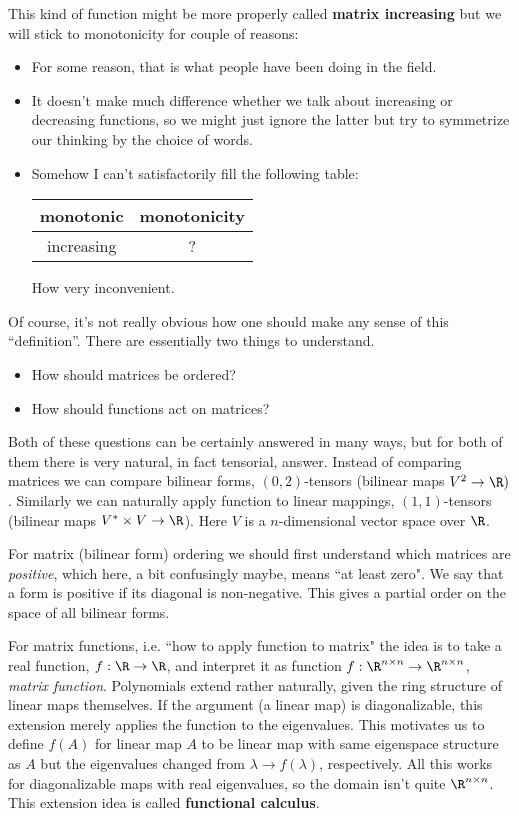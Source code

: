 This kind of function might be more properly called \textbf{matrix increasing} but we will stick to monotonicity for couple of reasons:
\begin{itemize}
	\item For some reason, that is what people have been doing in the field.
	\item It doesn't make much difference whether we talk about increasing or decreasing functions, so we might just ignore the latter but try to symmetrize our thinking by the choice of words.
	\item Somehow I can't satisfactorily fill the following table:
	\begin{center}
	\begin{tabular}{| c | c |}
		\hline
		monotonic & monotonicity \\
		\hline
		increasing & ? \\
		\hline
	\end{tabular}
	\end{center}
	How very inconvenient.
\end{itemize}

Of course, it's not really obvious how one should make any sense of this ``definition''. There are essentially two things to understand.
\begin{itemize}
	\item How should matrices be ordered?
	\item How should functions act on matrices?
\end{itemize}
Both of these questions can be certainly answered in many ways, but for both of them there is very natural, in fact tensorial, answer. Instead of comparing matrices we can compare bilinear forms, $(0, 2)$-tensors (bilinear maps $V^2 \to \R)$. Similarly we can naturally apply function to linear mappings, $(1, 1)$-tensors (bilinear maps $V^{*} \times V \to \R$). Here $V$ is a $n$-dimensional vector space over $\R$.

For matrix (bilinear form) ordering we should first understand which matrices are \textit{positive}, which here, a bit confusingly maybe, means ``at least zero". We say that a form is positive if its diagonal is non-negative. This gives a partial order on the space of all bilinear forms.

For matrix functions, i.e. ``how to apply function to matrix" the idea is to take a real function, $f : \R \to \R$, and interpret it as function $f : \R^{n \times n} \to \R^{n \times n}$, \textit{matrix function}. Polynomials extend rather naturally, given the ring structure of linear maps themselves. If the argument (a linear map) is diagonalizable, this extension merely applies the function to the eigenvalues. This motivates us to define $f(A)$ for linear map $A$ to be linear map with same eigenspace structure as $A$ but the eigenvalues changed from $\lambda \to f(\lambda)$, respectively. All this works for diagonalizable maps with real eigenvalues, so the domain isn't quite $\R^{n \times n}$. This extension idea is called \textbf{functional calculus}.

